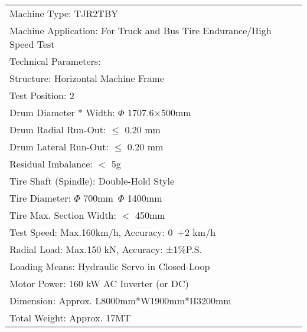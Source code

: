 \documentclass[varwidth=\maxdimen]{standalone}
\begin{document}
\begin{tabular}{ ||l|| }
	\toprule
	Machine Type: TJR2TBY \\
	Machine Application: For Truck and Bus Tire Endurance/High Speed Test \\
	Technical Parameters: \\
	Structure: Horizontal Machine Frame \\
	Test Position: 2 \\
	Drum Diameter * Width: $\Phi$ 1707.6×500mm \\
	Drum Radial Run-Out: $\leq$ 0.20 mm \\
	Drum Lateral Run-Out: $\leq$ 0.20 mm \\
	Residual Imbalance: $<$ 5g \\
	Tire Shaft (Spindle): Double-Hold Style \\
	Tire Diameter: $\Phi$ 700mm~$\Phi$ 1400mm \\
	Tire Max. Section Width: $<$ 450mm \\
	Test Speed: Max.160km/h, Accuracy: 0~+2 km/h \\
	Radial Load: Max.150 kN, Accuracy: ±1\%P.S. \\
	Loading Means: Hydraulic Servo in Closed-Loop \\
	Motor Power: 160 kW AC Inverter (or DC) \\
	Dimension: Approx. L8000mm*W1900mm*H3200mm \\
	Total Weight: Approx. 17MT \\
	\bottomrule
\end{tabular}
\end{document}
